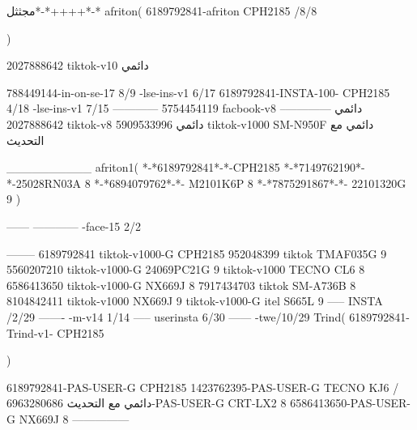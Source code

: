مجثثل*-*++++*-*
afriton(
6189792841-afriton CPH2185  /8/8

)

2027888642 tiktok-v10
دائمي

788449144-in-on-se-17 8/9
-lse-ins-v1 6/17
6189792841-INSTA-100- CPH2185 4/18
-lse-ins-v1 7/15
------------
5754454119 facbook-v8
دائمي
--------------
2027888642 tiktok-v8
دائمي
5909533996 tiktok-v1000  SM-N950F
دائمي مع التحديث

__________
afriton1(
*-*6189792841*-*-CPH2185
*-*7149762190*-*-25028RN03A  8
*-*6894079762*-*- M2101K6P   8
*-*7875291867*-*- 22101320G   9\2
)


------
------------
-face-15 2/2

--------
6189792841 tiktok-v1000-G CPH2185 
952048399 tiktok TMAF035G 9
5560207210 tiktok-v1000-G 24069PC21G  9 tiktok-v1000 TECNO CL6  8
6586413650 tiktok-v1000-G NX669J  8
7917434703 tiktok  SM-A736B   8
8104842411 tiktok-v1000 NX669J  9 tiktok-v1000-G  itel S665L  9\3
-----
 INSTA /2/29
-------
-m-v14 1/14
-----
userinsta 6/30
------
-twe/10/29
Trind(
6189792841-Trind-v1- CPH2185 

)


6189792841-PAS-USER-G CPH2185 
1423762395-PAS-USER-G TECNO KJ6  /دائمي مع التحديث
6963280686-PAS-USER-G  CRT-LX2  8
6586413650-PAS-USER-G  NX669J  8
    ---------------
